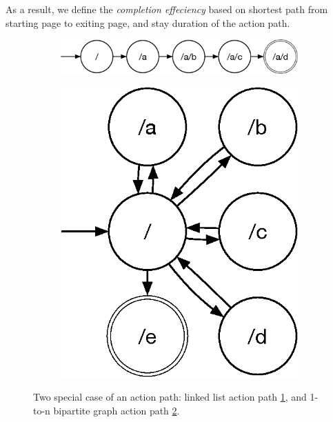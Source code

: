 As a result, we define the \emph{completion effeciency} based on shortest path from starting page
to exiting page, and stay duration of the action path. 

\begin{figure}[H]
    \centering

\begin{subfigure}[b]{0.55\textwidth}
    \includegraphics[width=1\textwidth]{figures/linked-list}
    \caption{}
    \label{fig:sim-action-1}
\end{subfigure}
    
\begin{subfigure}[b]{0.23\textwidth}
    \includegraphics[width=1\textwidth]{figures/1ton}
    \caption{}
    \label{fig:sim-action-2}
\end{subfigure}

\caption{Two special case of an action path: linked list action path \ref{fig:sim-action-1}, and 
1-to-n bipartite graph action path \ref{fig:sim-action-2}.}
\label{fig:sim-action-path}
\end{figure}


